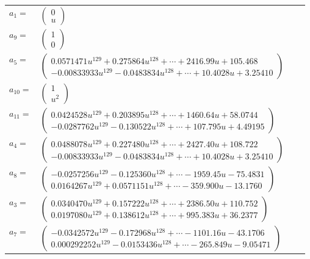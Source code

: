 \documentclass[1p]{elsarticle_modified}
\theoremstyle{definition}
\begin{document}
\begin{tabular}{m{7pt} m{180pt} m{7pt} m{180pt} }
\flushright $a_{1}=$&$\begin{pmatrix}0\\u\end{pmatrix}$ \\
\flushright $a_{9}=$&$\begin{pmatrix}1\\0\end{pmatrix}$ \\
\flushright $a_{5}=$&$\begin{pmatrix}0.0571471 u^{129}+0.275864 u^{128}+\cdots+2416.99 u+105.468\\-0.00833933 u^{129}-0.0483834 u^{128}+\cdots+10.4028 u+3.25410\end{pmatrix}$ \\
\flushright $a_{10}=$&$\begin{pmatrix}1\\u^2\end{pmatrix}$ \\
\flushright $a_{11}=$&$\begin{pmatrix}0.0424528 u^{129}+0.203895 u^{128}+\cdots+1460.64 u+58.0744\\-0.0287762 u^{129}-0.130522 u^{128}+\cdots+107.795 u+4.49195\end{pmatrix}$ \\
\flushright $a_{4}=$&$\begin{pmatrix}0.0488078 u^{129}+0.227480 u^{128}+\cdots+2427.40 u+108.722\\-0.00833933 u^{129}-0.0483834 u^{128}+\cdots+10.4028 u+3.25410\end{pmatrix}$ \\
\flushright $a_{8}=$&$\begin{pmatrix}-0.0257256 u^{129}-0.125360 u^{128}+\cdots-1959.45 u-75.4831\\0.0164267 u^{129}+0.0571151 u^{128}+\cdots-359.900 u-13.1760\end{pmatrix}$ \\
\flushright $a_{3}=$&$\begin{pmatrix}0.0340470 u^{129}+0.157222 u^{128}+\cdots+2386.50 u+110.752\\0.0197080 u^{129}+0.138612 u^{128}+\cdots+995.383 u+36.2377\end{pmatrix}$ \\
\flushright $a_{7}=$&$\begin{pmatrix}-0.0342572 u^{129}-0.172968 u^{128}+\cdots-1101.16 u-43.1706\\0.000292252 u^{129}-0.0153436 u^{128}+\cdots-265.849 u-9.05471\end{pmatrix}$ \\

\end{tabular}
\end{document}
